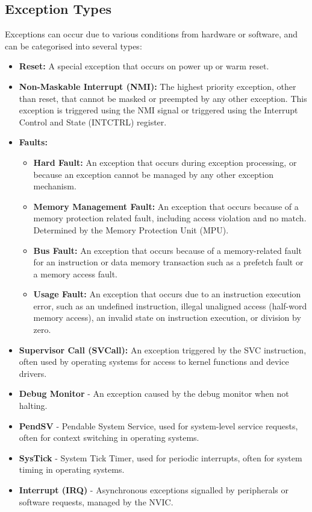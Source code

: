 \documentclass{article}
\begin{document}
\subsection{Exception Types}
Exceptions can occur due to various conditions from hardware or
software, and can be categorised into several types:
\begin{itemize}
    \item \textbf{Reset:} A special exception that occurs on power up or
          warm reset.
    \item \textbf{Non-Maskable Interrupt (NMI):} The highest priority
          exception, other than reset, that cannot be masked or
          preempted by any other exception. This exception is triggered
          using the NMI signal or triggered using the Interrupt Control
          and State (INTCTRL) register.
    \item \textbf{Faults:}
          \begin{itemize}
              \item \textbf{Hard Fault:} An exception that occurs during
                    exception processing, or because an exception cannot be
                    managed by any other exception mechanism.
              \item \textbf{Memory Management Fault:} An exception that
                    occurs because of a memory protection related fault, including
                    access violation and no match. Determined by the
                    Memory Protection Unit (MPU).
              \item \textbf{Bus Fault:} An exception that occurs because
                    of a memory-related fault for an instruction or data memory
                    transaction such as a prefetch fault or a memory access fault.
              \item \textbf{Usage Fault:} An exception that occurs due to
                    an instruction execution error, such as an undefined
                    instruction, illegal unaligned access (half-word memory access), an invalid
                    state on instruction execution, or division by zero.
          \end{itemize}
    \item \textbf{Supervisor Call (SVCall):} An exception triggered by
          the SVC instruction, often used by operating systems for access to kernel
          functions and device drivers.
    \item \textbf{Debug Monitor} - An exception caused by the debug
          monitor when not halting.
    \item \textbf{PendSV} - Pendable System Service, used for system-level
          service requests, often for context switching in operating
          systems.
    \item \textbf{SysTick} - System Tick Timer, used for periodic
          interrupts, often for system timing in operating systems.
    \item \textbf{Interrupt (IRQ)} - Asynchronous exceptions signalled by
          peripherals or software requests, managed by the NVIC.
\end{itemize}
\end{document}

